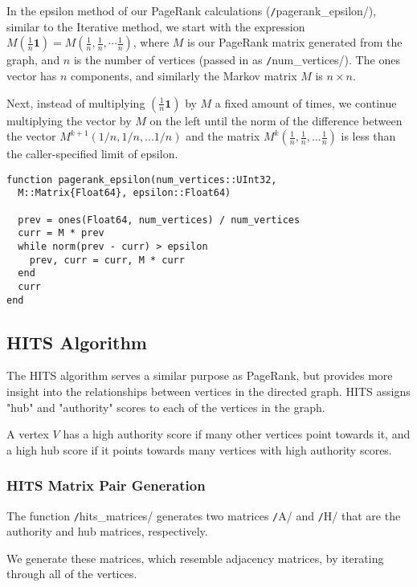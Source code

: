 \documentclass[12pt, titlepage, twoside]{amsart}
\renewcommand{\vec}[1]{\ensuremath{\mathbf{#1}}}
\theoremstyle{remark}
\begin{document}
In the epsilon method of our PageRank calculations (\texttt/pagerank_epsilon/), 
similar to the Iterative method, 
we start with the expression $M(\frac{1}{n}\vec{1}) = M(\frac{1}{n}, \frac{1}{n}, \cdots \frac{1}{n})$, 
where $M$ is our PageRank matrix generated from the graph, 
and $n$ is the number of vertices (passed in as \texttt/num_vertices/). 
The ones vector has $n$ components, and similarly the Markov matrix $M$ is $n\times n$.

Next, instead of multiplying $(\frac{1}{n}\vec{1})$ by $M$ a fixed amount of times,
we continue multiplying the vector by $M$ on the left until the norm of the difference between the vector $M^{k+1}(1/n, 1/n, ... 1/n)$
and the matrix $M^k(\frac{1}{n}, \frac{1}{n}, ... \frac{1}{n})$ is
less than the caller-specified limit of epsilon.

\begin{verbatim}
function pagerank_epsilon(num_vertices::UInt32, 
  M::Matrix{Float64}, epsilon::Float64)
  
  prev = ones(Float64, num_vertices) / num_vertices
  curr = M * prev
  while norm(prev - curr) > epsilon
    prev, curr = curr, M * curr
  end
  curr
end
\end{verbatim}


\subsection{HITS Algorithm}

The HITS algorithm serves a similar purpose as PageRank,
but provides more insight into the relationships between vertices in the directed graph.
HITS assigns "hub" and "authority" scores to each of the vertices in the graph.

A vertex $V$ has a high authority score if many other vertices point towards it,
and a high hub score if it points towards many vertices with high authority scores.

\subsubsection{HITS Matrix Pair Generation}

The function \texttt/hits_matrices/ generates two matrices \texttt/A/ and \texttt/H/
that are the authority and hub matrices, respectively.

We generate these matrices, which resemble adjacency matrices, by iterating through all of the vertices.
\end{document}
